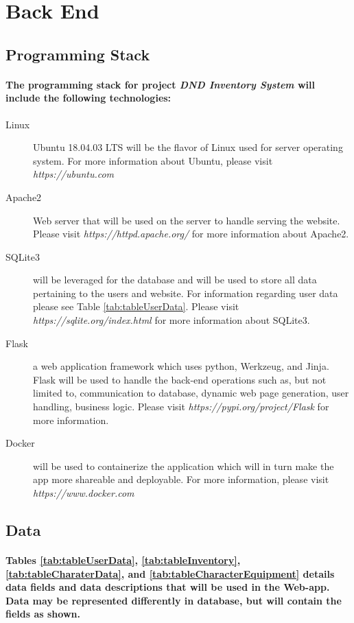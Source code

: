 \documentclass[12pt,letterpaper]{article}
\begin{document}
	\section{Back End}
		\subsection{Programming Stack}
			\paragraph{\indent The programming stack for project \emph{DND Inventory System} will include the following technologies: }
				\begin{description}
					\item[Linux] Ubuntu 18.04.03 LTS will be the flavor of Linux used for server operating system. For more information about Ubuntu, please visit \emph{https://ubuntu.com}\\
					\item[Apache2] Web server that will be used on the server to handle serving the website. Please visit \emph{https://httpd.apache.org/} for more information about Apache2.\\
					\item[SQLite3] will be leveraged for the database and will be used to store all data pertaining to the users and website. For information regarding user data please see Table \ref{tab:tableUserData}. Please visit \emph{https://sqlite.org/index.html} for more information about SQLite3.\\
					\item[Flask] a web application framework which uses python, Werkzeug, and Jinja. Flask will be used to handle the back-end operations such as, but not limited to, communication to database, dynamic web page generation, user handling, business logic. Please visit \emph{https://pypi.org/project/Flask} for more information.\\
					\item[Docker] will be used to containerize the application which will in turn make the app more shareable and deployable. For more information, please visit \emph{https://www.docker.com}\\ 
				\end{description}  
		\subsection{Data}
			\paragraph{\indent Tables \ref{tab:tableUserData}, \ref{tab:tableInventory}, \ref{tab:tableCharaterData}, and \ref{tab:tableCharacterEquipment} details data fields and data descriptions that will be used in the Web-app. Data may be represented differently in database, but will contain the fields as shown. \\}
\end{document}
